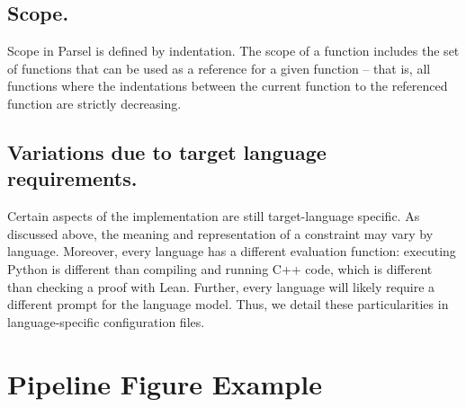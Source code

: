 \subsection{Scope.}
Scope in Parsel is defined by indentation. The scope  of a function  includes the set of functions that can be used as a reference for a given function -- that is, all functions where the indentations between the current function to the referenced function are strictly decreasing.

\subsection{Variations due to target language requirements.}
Certain aspects of the implementation are still target-language specific. As discussed above, the meaning and representation of a constraint may vary by language. Moreover, every language has a different evaluation function: executing Python is different than compiling and running C++ code, which is different than checking a proof with Lean. Further, every language will likely require a different prompt for the language model. Thus, we detail these particularities in language-specific configuration files.

\clearpage
\newpage

\section{Pipeline Figure Example}
\label{pipelineappendix}

